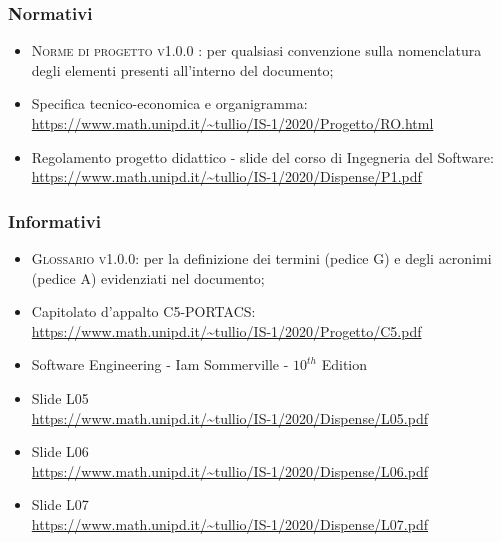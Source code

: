 \subsubsection{Normativi}

\begin{itemize}
	\item \textsc{Norme di progetto v1.0.0 }: per qualsiasi convenzione sulla nomenclatura degli elementi presenti all’interno del documento;
	\item Specifica tecnico-economica e organigramma: \\ {\url{https://www.math.unipd.it/~tullio/IS-1/2020/Progetto/RO.html}} %
	\item Regolamento progetto didattico - slide del corso di Ingegneria del Software: \\ {\url{https://www.math.unipd.it/~tullio/IS-1/2020/Dispense/P1.pdf}}
\end{itemize}



\subsubsection{Informativi}
\begin{itemize}
	\item \textsc{Glossario v1.0.0}: per la definizione dei termini (pedice G) e degli acronimi (pedice A) evidenziati nel documento;
	\item Capitolato d'appalto C5-PORTACS: \\
{\url{https://www.math.unipd.it/~tullio/IS-1/2020/Progetto/C5.pdf}}
	\item Software Engineering - Iam Sommerville - $10^{th}$ Edition
	\item Slide L05 \\
	{\url{https://www.math.unipd.it/~tullio/IS-1/2020/Dispense/L05.pdf}}%
	\item Slide L06 \\
	{\url{https://www.math.unipd.it/~tullio/IS-1/2020/Dispense/L06.pdf}}%
	\item Slide L07 \\
	{\url{https://www.math.unipd.it/~tullio/IS-1/2020/Dispense/L07.pdf}}%
\end{itemize}